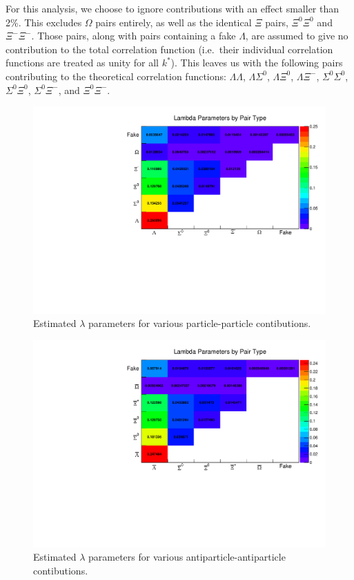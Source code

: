 For this analysis, we choose to ignore contributions with an effect smaller than 2\%.
This excludes $\Omega$ pairs entirely, as well as the identical $\Xi$ pairs, $\Xi^0\Xi^0$ and $\Xi^-\Xi^-$. Those pairs, along with pairs containing a fake $\Lambda$, are assumed to give no contribution to the total correlation function (i.e.\ their individual correlation functions are treated as unity for all $k^*$). This leaves us with the following pairs contributing to the theoretical correlation functions: $\Lambda\Lambda$, $\Lambda\Sigma^0$, $\Lambda\Xi^0$, $\Lambda\Xi^-$, $\Sigma^0\Sigma^0$, $\Sigma^0\Xi^0$, $\Sigma^0\Xi^-$, and $\Xi^0\Xi^-$.






\begin{figure}[hbt]
\includegraphics[width=36pc]{Figures/YieldAndEff/2016-08-12-LambdaParamsParticle.pdf}
\caption[Particle-particle $\lambda$ parameters]{
Estimated $\lambda$ parameters for various particle-particle contibutions.
}
\label{fig:LambdaParParticle}
\end{figure}

\begin{figure}[hbt]
\includegraphics[width=36pc]{Figures/YieldAndEff/2016-08-12-LambdaParamsAntiparticle.pdf}
\caption[Antiparticle-antiparticle $\lambda$ parameters]{
Estimated $\lambda$ parameters for various antiparticle-antiparticle contibutions.
}
\label{fig:LambdaParAntiparticle}
\end{figure}

